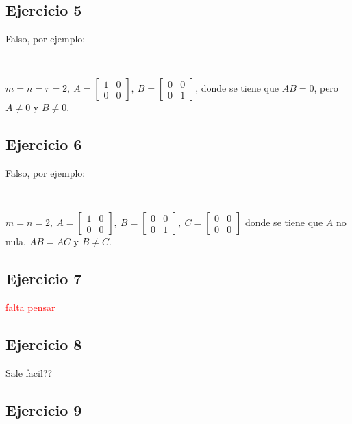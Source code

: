 \documentclass{article}
\begin{document}
\subsection*{Ejercicio 5}

Falso, por ejemplo:

\

\noindent $m = n = r = 2, ~
A = \begin{bmatrix}
    1 & 0 \\
    0 & 0
\end{bmatrix}, ~
B = \begin{bmatrix}
    0 & 0 \\
    0 & 1
\end{bmatrix}$, donde se tiene que $AB = 0$, pero $A \neq 0$ y $B \neq 0$.

\subsection*{Ejercicio 6}

Falso, por ejemplo:

\

\noindent $m = n = 2, ~
A = \begin{bmatrix}
    1 & 0 \\
    0 & 0
\end{bmatrix}, ~
B = \begin{bmatrix}
    0 & 0 \\
    0 & 1
\end{bmatrix}, ~
C = \begin{bmatrix}
    0 & 0 \\
    0 & 0
\end{bmatrix}$ donde se tiene que $A$ no nula, $AB = AC$ y $B \neq C$.

\subsection*{Ejercicio 7}

\textcolor{red}{falta pensar}

\subsection*{Ejercicio 8}

Sale facil??

\subsection*{Ejercicio 9}
\end{document}
